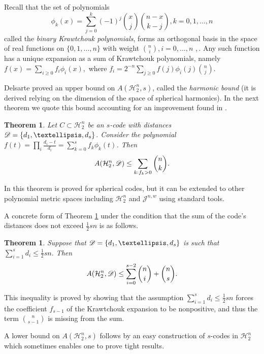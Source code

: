 \documentclass{amsart}
\newtheorem{theoremenv}[definitionenv]{Theorem}
\newenvironment{theorem}{\begin{theoremenv}\rm}{\end{theoremenv}}
\newcommand{\cH}{\mathcal{H}}
\newcommand{\cJ}{\mathcal{J}}
\begin{document}
Recall that the set of polynomials
\begin{equation}\label{eq:Krawtchouk}
    \phi_{k}(x) = \sum_{j = 0}^{k} (-1)^{j}\binom{x}{j}\binom{n-x}{k-j}, k=0,1,\dots,n
\end{equation}
called the {\em binary Krawtchouk polynomials}, forms an orthogonal basis in the space of real functions on $\{0,1,\dots,n\}$ with weight $\binom ni,i=0,\dots,n$  \cite{D73},\,\cite[Ch.5]{MS77}. Any such function has a unique expansion as a sum of Krawtchouk polynomials, namely $f(x)=\sum_{i\ge 0} f_i \phi_i(x),$ where $f_i=2^{-n}\sum_{j\ge0} f(j)\phi_i(j)\binom nj.$


Delsarte \cite{D73,Del73b} proved an upper bound on $A(\cH_2^n,s)$, called the {\em harmonic bound} 
(it is derived relying on the dimension of the space of spherical harmonics). 
In the next theorem we quote this bound accounting for an improvement found in \cite{NS10}. 
\begin{theorem}\cite{NS10} \label{thm:HB}
Let $C \subset \cH_{2}^{n}$ be an $s$-code with distances $\sD=\{d_{1}, \dots, d_{s}\}$. Consider the polynomial $f(t) = \prod_{i} \frac{d_{i}-t}{d_{i}}= \sum_{k = 0}^{s}f_{k}\phi_k(t)$. Then
\[
A(\cH_2^n,\sD) \leq \sum_{k: f_{k} > 0} \binom{n}{k}.
\]
\end{theorem}
In \cite{NS10} this theorem is proved for spherical codes, but it can be extended to other polynomial metric spaces including
$\cH_2^n$ and $\cJ^{n,w}$ using standard tools.

A concrete form of Theorem \ref{thm:HB} under the condition that the sum of 
the code's distances does not exceed $\frac{1}{2}sn$ is as follows.
\begin{theorem}\cite[Theorem $11$]{BM11}
\label{thm:ham_up}
Suppose that $\sD=\{d_1,\dots,d_s\}$ is such that $\sum_{i = 1}^{s} d_{i} \leq \frac{1}{2}sn.$ Then
\begin{equation*}
    A(\cH_2^n,\sD) \leq \sum_{i = 0}^{s-2} \binom{n}{i} + \binom{n}{s}.
\end{equation*}
\end{theorem}
This inequality is proved by showing that the assumption $ \sum_{i = 1}^{s} d_{i} \leq \frac{1}{2}sn$ 
forces the coefficient $f_{s-1}$ of the Krawtchouk expansion to be nonpositive, and thus the term $\binom n{s-1}$ 
is missing from the sum. 

A lower bound on $A(\cH_2^n,s)$ follows by an easy construction of $s$-codes in $\cH_{2}^{n}$ which sometimes 
enables one to prove tight results.
\end{document}
